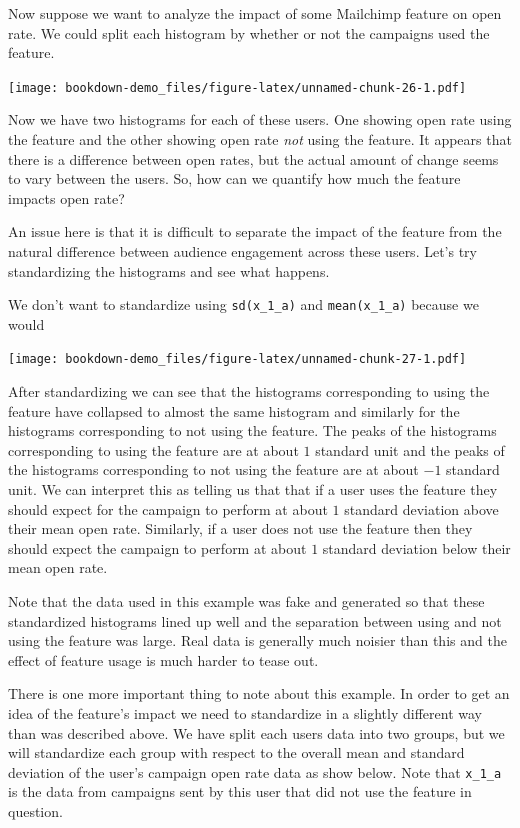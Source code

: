 \documentclass[]{book}
\begin{document}
Now suppose we want to analyze the impact of some Mailchimp feature on open rate. We could split each histogram by whether or not the campaigns used the feature.

\texttt{[image: bookdown-demo\_files/figure-latex/unnamed-chunk-26-1.pdf]}

Now we have two histograms for each of these users. One showing open rate using the feature and the other showing open rate \emph{not} using the feature. It appears that there is a difference between open rates, but the actual amount of change seems to vary between the users. So, how can we quantify how much the feature impacts open rate?

An issue here is that it is difficult to separate the impact of the feature from the natural difference between audience engagement across these users. Let's try standardizing the histograms and see what happens.

We don't want to standardize using \texttt{sd(x\_1\_a)} and \texttt{mean(x\_1\_a)} because we would

\texttt{[image: bookdown-demo\_files/figure-latex/unnamed-chunk-27-1.pdf]}

After standardizing we can see that the histograms corresponding to using the feature have collapsed to almost the same histogram and similarly for the histograms corresponding to not using the feature. The peaks of the histograms corresponding to using the feature are at about \(1\) standard unit and the peaks of the histograms corresponding to not using the feature are at about \(-1\) standard unit. We can interpret this as telling us that that if a user uses the feature they should expect for the campaign to perform at about \(1\) standard deviation above their mean open rate. Similarly, if a user does not use the feature then they should expect the campaign to perform at about \(1\) standard deviation below their mean open rate.

Note that the data used in this example was fake and generated so that these standardized histograms lined up well and the separation between using and not using the feature was large. Real data is generally much noisier than this and the effect of feature usage is much harder to tease out.

There is one more important thing to note about this example. In order to get an idea of the feature's impact we need to standardize in a slightly different way than was described above. We have split each users data into two groups, but we will standardize each group with respect to the overall mean and standard deviation of the user's campaign open rate data as show below. Note that \texttt{x\_1\_a} is the data from campaigns sent by this user that did not use the feature in question.
\end{document}
